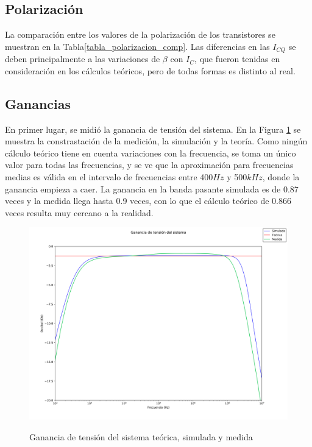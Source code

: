 \subsection{Polarización}
La comparación entre los valores de la polarización de los transistores se muestran en la Tabla\ref{tabla_polarizacion_comp}. Las diferencias en las $I_{CQ}$ se deben principalmente a las variaciones de $\beta$ con $I_{C}$, que fueron tenidas en consideración en los cálculos teóricos, pero de todas formas es distinto al real.


\subsection{Ganancias}
En primer lugar, se midió la ganancia de tensión del sistema. En la Figura \ref{fig_bode_avs} se muestra la constrastación de la medición, la simulación y la teoría. Como ningún cálculo teórico tiene en cuenta variaciones con la frecuencia, se toma un único valor para todas las frecuencias, y se ve que la aproximación para frecuencias medias es válida en el intervalo de frecuencias entre 400$Hz$ y 500$kHz$, donde la ganancia empieza a caer. La ganancia en la banda pasante simulada es de 0.87 veces y la medida llega hasta 0.9 veces, con lo que el cálculo teórico de 0.866 veces resulta muy cercano a la realidad.

		\begin{figure}[H]
			\centering
			\includegraphics[scale=0.4]{./Imagenes/bode_Avs.png} \\
			\caption{Ganancia de tensión del sistema teórica, simulada y medida}
			\label{fig_bode_avs}
		\end{figure}

